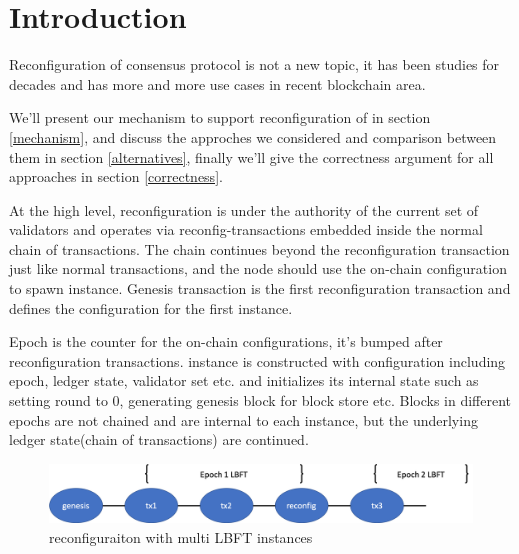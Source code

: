 \section{Introduction}
Reconfiguration of consensus protocol is not a new topic, it has been studies for decades and has more and more use cases in recent blockchain
area.

We'll present our mechanism to support reconfiguration of \LBFT in section \ref{mechanism}, and discuss the approches we considered and
comparison between them in section \ref{alternatives}, finally we'll give the correctness argument for all approaches in section \ref{correctness}.

At the high level, reconfiguration is under the authority of the current set of validators and operates via reconfig-transactions embedded inside the normal chain of transactions.
The chain continues beyond the reconfiguration transaction just like normal transactions, and the node should use the on-chain configuration to
spawn \LBFT instance. Genesis transaction is the first reconfiguration transaction and defines the configuration for the first \LBFT instance.

Epoch is the counter for the on-chain configurations, it's bumped after reconfiguration transactions. \LBFT instance is constructed with configuration
including epoch, ledger state, validator set etc. and initializes its internal state such as setting round to 0, generating genesis block for block store
etc. Blocks in different epochs are not chained and are internal to each \LBFT instance, but the underlying ledger state(chain of transactions) are continued.

\begin{figure}[ht]
	\centering
\includegraphics[scale=.45]{figures/introduction.png}
\caption{reconfiguraiton with multi LBFT instances}
\end{figure}
